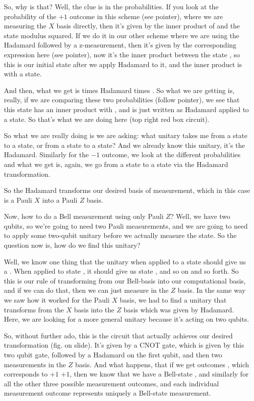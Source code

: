 So, why is that? Well, the clue is in the probabilities. If you look at the probability of the $+1$ outcome in this scheme (see pointer), where we are measuring the $X$ basis directly, then it's given by the inner product of \ket{\psi} and the \ket{+} state modulus squared. If we do it in our other scheme where we are using the Hadamard followed by a z-measurement, then it's given by the corresponding expression here (see pointer), now it's the inner product between the state , so this is our initial state after we apply Hadamard to it, and the inner product is with a  state.

And then, what we get is \ket{\psi} times Hadamard times . So what we are getting is, really, if we are comparing these two probabilities (follow pointer), we see that this \ket{\psi} state has an inner product with \ket{+}, and \ket{+} is just written as Hadamard applied to a  state. So that's what we are doing here (top right red box circuit).

So what we are really doing is we are asking: what unitary takes me from a \ket{+} state to a  state, or from a  state to a \ket{+} state? And we already know this unitary, it's the Hadamard. Similarly for the  $-1$ outcome, we look at the different probabilities and what we get is, again, we go from a \ket{-} state to a  state via the Hadamard transformation.

So the Hadamard transforms our desired basis of measurement, which in this case is a Pauli $X$ into a Pauli $Z$ basis.

Now, how to do a Bell measurement using only Pauli $Z$? Well, we have two qubits, so we're going to need two Pauli measurements, and we are going to need to apply some two-qubit unitary before we actually measure the state. So the question now is, how do we find this unitary?

Well, we know one thing that the unitary when applied to a state \ket{\Psi^+} should give us a . When applied to state \ket{\Phi^-}, it should give us state , and so on and so forth. So this is our rule of transforming from our Bell-basis into our computational basis, and if we can do that, then we can just measure in the $Z$ basis. In the same way we saw how it worked for the Pauli $X$ basis, we had to find a unitary that transforms from the $X$ basis into the $Z$ basis which was given by Hadamard. Here, we are looking for a more general unitary because it's acting on two qubits.

So, without further ado, this is the circuit that actually achieves our desired transformation (fig. on slide). It's given by a CNOT gate, which is given by this two qubit gate, followed by a Hadamard on the first qubit, and then two measurements in the $Z$ basis. And what happens, that if we get outcomes , which corresponds to  $+1$  $+1$, then we know that we have a Bell-state \ket{\Phi^+}, and similarly for all the other three possible measurement outcomes, and each individual measurement outcome represents uniquely a Bell-state measurement.


